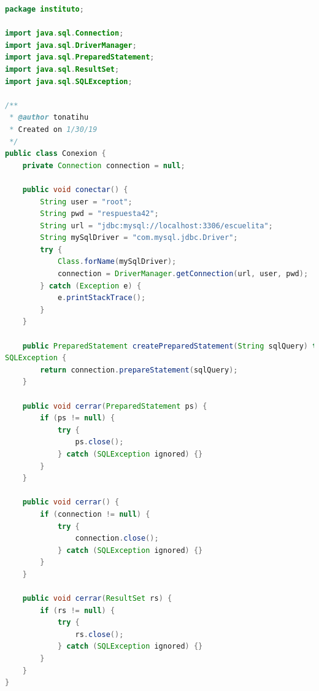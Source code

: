 \documentclass[a4paper,12pt]{article}
\begin{document}
\begin{lstlisting}[language=Java, style=customJava, 
caption={Conexion.java},captionpos=b,basicstyle=\fontfamily{cmss}\small]
package instituto;

import java.sql.Connection;
import java.sql.DriverManager;
import java.sql.PreparedStatement;
import java.sql.ResultSet;
import java.sql.SQLException;

/**
 * @author tonatihu
 * Created on 1/30/19
 */
public class Conexion {
    private Connection connection = null;

    public void conectar() {
        String user = "root";
        String pwd = "respuesta42";
        String url = "jdbc:mysql://localhost:3306/escuelita";
        String mySqlDriver = "com.mysql.jdbc.Driver";
        try {
            Class.forName(mySqlDriver);
            connection = DriverManager.getConnection(url, user, pwd);
        } catch (Exception e) {
            e.printStackTrace();
        }
    }

    public PreparedStatement createPreparedStatement(String sqlQuery) throws 
SQLException {
        return connection.prepareStatement(sqlQuery);
    }

    public void cerrar(PreparedStatement ps) {
        if (ps != null) {
            try {
                ps.close();
            } catch (SQLException ignored) {}
        }
    }

    public void cerrar() {
        if (connection != null) {
            try {
                connection.close();
            } catch (SQLException ignored) {}
        }
    }

    public void cerrar(ResultSet rs) {
        if (rs != null) {
            try {
                rs.close();
            } catch (SQLException ignored) {}
        }
    }
}
\end{lstlisting}
\end{document}

